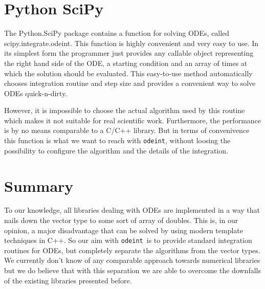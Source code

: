 \documentclass[a4paper,10pt]{article}
\newcommand{\odeint}{{\tt odeint}}
\begin{document}
\section{Python SciPy}
The Python.SciPy package contains a function for solving ODEs, called scipy.integrate.odeint.
This function is highly convenient and very easy to use.
In its simplest form the programmer just provides any callable object representing the right hand side of the ODE, a starting condition and an array of times at which the solution should be evaluated.
This easy-to-use method automatically chooses integration routine and step size and provides a convenient way to solve ODEs quick-n-dirty.

However, it is impossible to choose the actual algorithm used by this routine which makes it not suitable for real scientific work.
Furthermore, the performance is by no means comparable to a C/C++ library.
But in terms of convenivence this function is what we want to reach with \odeint, without loosing the possibility to configure the algorithm and the details of the integration.

\section*{Summary}
To our knowledge, all libraries dealing with ODEs are implemented in a way that nails down the vector type to some sort of array of doubles.
This is, in our opinion, a major disadvantage that can be solved by using modern template techniques in C++.
So our aim with \odeint\ is to provide standard integration routines for ODEs, but completely separate the algorithms from the vector types.
We currently don't know of any comparable approach towards numerical libraries but we do believe that with this separation we are able to overcome the downfalls of the existing libraries presented before.
\end{document}
